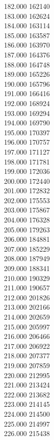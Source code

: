 { 182.000	162140 \\
 183.000	162624 \\
 184.000	163114 \\
 185.000	163587 \\
 186.000	163970 \\
 187.000	164376 \\
 188.000	164748 \\
 189.000	165226 \\
 190.000	165796 \\
 191.000	166416 \\
 192.000	168924 \\
 193.000	169294 \\
 194.000	169790 \\
 195.000	170397 \\
 196.000	170757 \\
 197.000	171127 \\
 198.000	171781 \\
 199.000	172036 \\
 200.000	172440 \\
 201.000	172832 \\
 202.000	175553 \\
 203.000	175867 \\
 204.000	176328 \\
 205.000	179263 \\
 206.000	184881 \\
 207.000	185229 \\
 208.000	187949 \\
 209.000	188341 \\
 210.000	190329 \\
 211.000	190657 \\
 212.000	201826 \\
 213.000	202166 \\
 214.000	202659 \\
 215.000	205997 \\
 216.000	206466 \\
 217.000	206922 \\
 218.000	207377 \\
 219.000	207859 \\
 220.000	212995 \\
 221.000	213424 \\
 222.000	213682 \\
 223.000	214145 \\
 224.000	214500 \\
 225.000	214997 \\
 226.000	215438 \\
}
